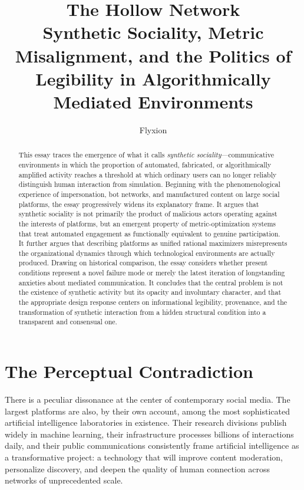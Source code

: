 \documentclass[12pt, a4paper]{article}
\title{\textbf{The Hollow Network}\\[0.5em]
\large Synthetic Sociality, Metric Misalignment, and the Politics of Legibility in Algorithmically Mediated Environments}
\author{Flyxion}
\date{}
\begin{document}
\maketitle
\thispagestyle{empty}

\begin{abstract}
\noindent This essay traces the emergence of what it calls \emph{synthetic sociality}---communicative environments in which the proportion of automated, fabricated, or algorithmically amplified activity reaches a threshold at which ordinary users can no longer reliably distinguish human interaction from simulation. Beginning with the phenomenological experience of impersonation, bot networks, and manufactured content on large social platforms, the essay progressively widens its explanatory frame. It argues that synthetic sociality is not primarily the product of malicious actors operating against the interests of platforms, but an emergent property of metric-optimization systems that treat automated engagement as functionally equivalent to genuine participation. It further argues that describing platforms as unified rational maximizers misrepresents the organizational dynamics through which technological environments are actually produced. Drawing on historical comparison, the essay considers whether present conditions represent a novel failure mode or merely the latest iteration of longstanding anxieties about mediated communication. It concludes that the central problem is not the existence of synthetic activity but its opacity and involuntary character, and that the appropriate design response centers on informational legibility, provenance, and the transformation of synthetic interaction from a hidden structural condition into a transparent and consensual one.
\end{abstract}

\newpage
\setcounter{page}{1}

\section{The Perceptual Contradiction}

There is a peculiar dissonance at the center of contemporary social media. The largest platforms are also, by their own account, among the most sophisticated artificial intelligence laboratories in existence. Their research divisions publish widely in machine learning, their infrastructure processes billions of interactions daily, and their public communications consistently frame artificial intelligence as a transformative project: a technology that will improve content moderation, personalize discovery, and deepen the quality of human connection across networks of unprecedented scale.
\end{document}
